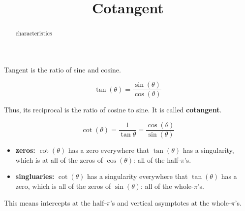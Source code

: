\documentclass{ximera}
\title{Cotangent}
\begin{document}
\begin{abstract}
characteristics
\end{abstract}
\maketitle




Tangent is the ratio of sine and cosine. 

\[   \tan(\theta)  =  \frac{\sin(\theta)}{\cos(\theta)}  \]

Thus, its reciprocal is the ratio of cosine to sine.  It is called \textbf{cotangent}.


\[   \cot(\theta)  =  \frac{1}{\tan{\theta}}  =   \frac{\cos(\theta)}{\sin(\theta)}  \]




\begin{itemize}
\item \textbf{zeros:} $\cot(\theta)$ has a zero everywhere that $\tan(\theta)$ has a singularity, which is at all of the zeros of $\cos(\theta)$:  all of the half-$\pi$'s.
\item \textbf{singluaries:} $\cot(\theta)$ has a singularity everywhere that $\tan(\theta)$ has a zero, which is all of the zeros of $\sin(\theta)$:  all of the whole-$\pi$'s.
\end{itemize}

This means intercepts at the half-$\pi$'s and vertical asymptotes at the whole-$\pi$'s.
\end{document}
